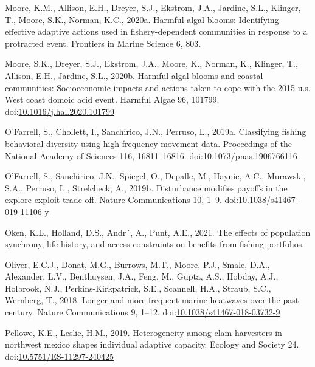 \documentclass[]{elsarticle} %
\begin{document}
\leavevmode\hypertarget{ref-Moore2020harmful}{}%
Moore, K.M., Allison, E.H., Dreyer, S.J., Ekstrom, J.A., Jardine, S.L.,
Klinger, T., Moore, S.K., Norman, K.C., 2020a. Harmful algal blooms:
Identifying effective adaptive actions used in fishery-dependent
communities in response to a protracted event. Frontiers in Marine
Science 6, 803.

\leavevmode\hypertarget{ref-Moore2020}{}%
Moore, S.K., Dreyer, S.J., Ekstrom, J.A., Moore, K., Norman, K.,
Klinger, T., Allison, E.H., Jardine, S.L., 2020b. Harmful algal blooms
and coastal communities: Socioeconomic impacts and actions taken to cope
with the 2015 u.s. West coast domoic acid event. Harmful Algae 96,
101799.
doi:\href{https://doi.org/10.1016/j.hal.2020.101799}{10.1016/j.hal.2020.101799}

\leavevmode\hypertarget{ref-OFarrell2019}{}%
O'Farrell, S., Chollett, I., Sanchirico, J.N., Perruso, L., 2019a.
Classifying fishing behavioral diversity using high-frequency movement
data. Proceedings of the National Academy of Sciences 116, 16811--16816.
doi:\href{https://doi.org/10.1073/pnas.1906766116}{10.1073/pnas.1906766116}

\leavevmode\hypertarget{ref-OFarrell2019a}{}%
O'Farrell, S., Sanchirico, J.N., Spiegel, O., Depalle, M., Haynie, A.C.,
Murawski, S.A., Perruso, L., Strelcheck, A., 2019b. Disturbance modifies
payoffs in the explore-exploit trade-off. Nature Communications 10,
1--9.
doi:\href{https://doi.org/10.1038/s41467-019-11106-y}{10.1038/s41467-019-11106-y}

\leavevmode\hypertarget{ref-Oken2021}{}%
Oken, K.L., Holland, D.S., Andr´, A., Punt, A.E., 2021. The effects of
population synchrony, life history, and access constraints on benefits
from fishing portfolios.

\leavevmode\hypertarget{ref-Oliver2018}{}%
Oliver, E.C.J., Donat, M.G., Burrows, M.T., Moore, P.J., Smale, D.A.,
Alexander, L.V., Benthuysen, J.A., Feng, M., Gupta, A.S., Hobday, A.J.,
Holbrook, N.J., Perkins-Kirkpatrick, S.E., Scannell, H.A., Straub, S.C.,
Wernberg, T., 2018. Longer and more frequent marine heatwaves over the
past century. Nature Communications 9, 1--12.
doi:\href{https://doi.org/10.1038/s41467-018-03732-9}{10.1038/s41467-018-03732-9}

\leavevmode\hypertarget{ref-Pellowe2019}{}%
Pellowe, K.E., Leslie, H.M., 2019. Heterogeneity among clam harvesters
in northwest mexico shapes individual adaptive capacity. Ecology and
Society 24.
doi:\href{https://doi.org/10.5751/ES-11297-240425}{10.5751/ES-11297-240425}
\end{document}
